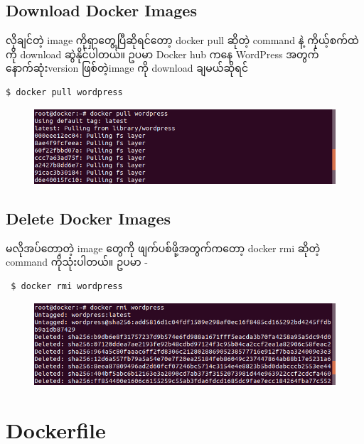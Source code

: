 \documentclass{article}
\begin{document}
\subsection{Download Docker Images}\label{download-docker-images}

လိုချင်တဲ့ image ကိုရှာတွေ့ပြီဆိုရင်တော့ docker pull ဆိုတဲ့ command နဲ့
ကိုယ့်စက်ထဲကို download ဆွဲနိုင်ပါတယ်။ ဥပမာ Docker hub ကနေ WordPress
အတွက်နောက်ဆုံးversion ဖြစ်တဲ့image ကို download ချမယ်ဆိုရင်

\begin{verbatim}
$ docker pull wordpress
\end{verbatim}

\begin{figure}[htbp]
\centering
\includegraphics[width=0.70\paperwidth]{.gitbook/assets/3_pull_wordpress.png}
\end{figure}

\subsection{Delete Docker Images}\label{delete-docker-images}

မလိုအပ်တော့တဲ့ image တွေကို ဖျက်ပစ်ဖို့အတွက်ကတော့ docker rmi ဆိုတဲ့
command ကိုသုံးပါတယ်။ ဥပမာ -

\begin{verbatim}
 $ docker rmi wordpress
\end{verbatim}

\begin{figure}[htbp]
\centering
\includegraphics[width=0.70\paperwidth]{.gitbook/assets/4_rmi.png}
\end{figure}

\section{Dockerfile}\label{dockerfile}
\end{document}
